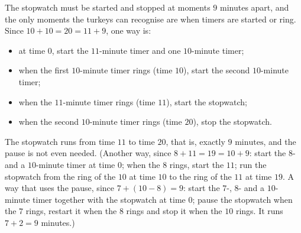 The stopwatch must be started and stopped at moments $9$ minutes apart, and the only moments the turkeys can recognise are when timers are started or ring. Since $10+10=20=11+9$, one way is:
\begin{itemize}
\item at time $0$, start the $11$-minute timer and one $10$-minute timer;
\item when the first $10$-minute timer rings (time $10$), start the second $10$-minute timer;
\item when the $11$-minute timer rings (time $11$), start the stopwatch;
\item when the second $10$-minute timer rings (time $20$), stop the stopwatch.
\end{itemize}
The stopwatch runs from time $11$ to time $20$, that is, exactly $\boxed{9\text{ minutes}}$, and the pause is not even needed. (Another way, since $8+11=19=10+9$: start the $8$- and a $10$-minute timer at time $0$; when the $8$ rings, start the $11$; run the stopwatch from the ring of the $10$ at time $10$ to the ring of the $11$ at time $19$. A way that uses the pause, since $7+(10-8)=9$: start the $7$-, $8$- and a $10$-minute timer together with the stopwatch at time $0$; pause the stopwatch when the $7$ rings, restart it when the $8$ rings and stop it when the $10$ rings. It runs $7+2=9$ minutes.)

